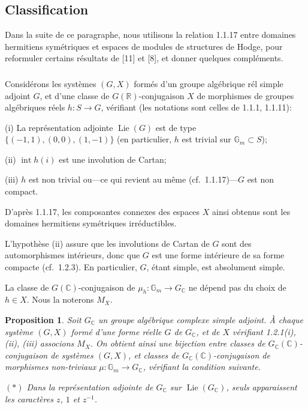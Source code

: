 \documentclass[12pt,a4paper]{article}
\theoremstyle{plain}
\newtheorem{proposition}[theorem]{Proposition}
\theoremstyle{definition}
\theoremstyle{remark}
\DeclareMathOperator{\Lie}{Lie}
\DeclareMathOperator{\Int}{int}
\newcommand{\RR}{\mathbb{R}}
\newcommand{\CC}{\mathbb{C}}
\newcommand{\Gm}{\mathbb{G}}
\begin{document}
\subsection{Classification}

Dans la suite de ce paragraphe, nous utilisons la relation 1.1.17 entre domaines hermitiens sym\'etriques et espaces de modules de structures de Hodge, pour reformuler certains r\'esultats de [11] et [8], et donner quelques compl\'ements.

\subsubsection{}

Consid\'erons les syst\`emes $(G,X)$ form\'es d'un groupe alg\'ebrique r\'el simple adjoint $G$, et d'une classe de $G(\RR)$-conjugaison $X$ de morphismes de groupes alg\'ebriques r\'eels $h:S \to G$, v\'erifiant (les notations sont celles de 1.1.1, 1.1.11):

(i) La repr\'esentation adjointe $\Lie(G)$ est de type $\{(-1,1),(0,0),(1,-1)\}$ (en particulier, $h$ est trivial sur $\Gm_m \subset S$);

(ii) $\Int h(i)$ est une involution de Cartan;

(iii) $h$ est non trivial ou---ce qui revient au m\^eme (cf.~1.1.17)---$G$ est non compact.

D'apr\`es 1.1.17, les composantes connexes des espaces $X$ ainsi obtenus sont les domaines hermitiens sym\'etriques irr\'eductibles.

L'hypoth\`ese (ii) assure que les involutions de Cartan de $G$ sont des automorphismes int\'erieurs, donc que $G$ est une forme int\'erieure de sa forme compacte (cf.~1.2.3). En particulier, $G$, \'etant simple, est absolument simple.

La classe de $G(\CC)$-conjugaison de $\mu_h:\Gm_m \to G_{\CC}$ ne d\'epend pas du choix de $h \in X$. Nous la noterons $M_X$.

\begin{proposition}
Soit $G_{\CC}$ un groupe alg\'ebrique complexe simple adjoint. \`A chaque syst\`eme $(G,X)$ form\'e d'une forme r\'eelle $G$ de $G_{\CC}$, et de $X$ v\'erifiant \textup{1.2.1(i), (ii), (iii)} associons $M_X$. On obtient ainsi une bijection entre classes de $G_{\CC}(\CC)$-conjugaison de syst\`emes $(G,X)$, et classes de $G_{\CC}(\CC)$-conjugaison de morphismes non-triviaux $\mu:\Gm_m \to G_{\CC}$, v\'erifiant la condition suivante.

$(*)$ Dans la repr\'esentation adjointe de $G_{\CC}$ sur $\Lie(G_{\CC})$, seuls apparaissent les caract\`eres $z$, $1$ et $z^{-1}$.
\end{proposition}
\end{document}
